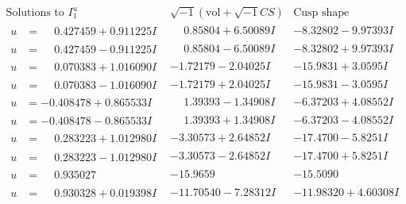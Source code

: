 \documentclass[1p]{elsarticle_modified}
\theoremstyle{definition}
\newcommand{\I}{\sqrt{-1}}
\begin{document}
$$\begin{array}{c|c|c}  
\text{Solutions to }I^u_{1}& \I (\text{vol} + \sqrt{-1}CS) & \text{Cusp shape}\\
 \hline 
\begin{aligned}
u &= \phantom{-}0.427459 + 0.911225 I\end{aligned}
 & \phantom{-}0.85804 + 6.50089 I & -8.32802 - 9.97393 I \\ \hline\begin{aligned}
u &= \phantom{-}0.427459 - 0.911225 I\end{aligned}
 & \phantom{-}0.85804 - 6.50089 I & -8.32802 + 9.97393 I \\ \hline\begin{aligned}
u &= \phantom{-}0.070383 + 1.016090 I\end{aligned}
 & -1.72179 - 2.04025 I & -15.9831 + 3.0595 I \\ \hline\begin{aligned}
u &= \phantom{-}0.070383 - 1.016090 I\end{aligned}
 & -1.72179 + 2.04025 I & -15.9831 - 3.0595 I \\ \hline\begin{aligned}
u &= -0.408478 + 0.865533 I\end{aligned}
 & \phantom{-}1.39393 - 1.34908 I & -6.37203 + 4.08552 I \\ \hline\begin{aligned}
u &= -0.408478 - 0.865533 I\end{aligned}
 & \phantom{-}1.39393 + 1.34908 I & -6.37203 - 4.08552 I \\ \hline\begin{aligned}
u &= \phantom{-}0.283223 + 1.012980 I\end{aligned}
 & -3.30573 + 2.64852 I & -17.4700 - 5.8251 I \\ \hline\begin{aligned}
u &= \phantom{-}0.283223 - 1.012980 I\end{aligned}
 & -3.30573 - 2.64852 I & -17.4700 + 5.8251 I \\ \hline\begin{aligned}
u &= \phantom{-}0.935027\phantom{ +0.000000I}\end{aligned}
 & -15.9659\phantom{ +0.000000I} & -15.5090\phantom{ +0.000000I} \\ \hline\begin{aligned}
u &= \phantom{-}0.930328 + 0.019398 I\end{aligned}
 & -11.70540 - 7.28312 I & -11.98320 + 4.60308 I \\ \hline\begin{aligned}

\end{aligned}
\end{array}$$
\end{document}
